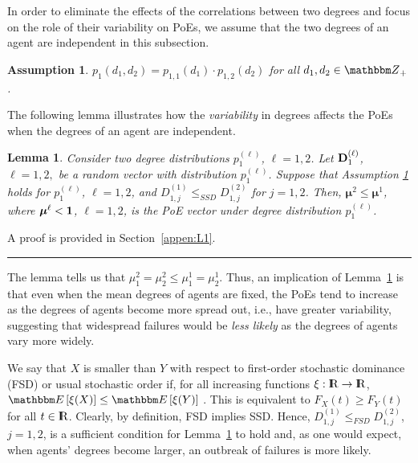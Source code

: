 \documentclass[10pt, journal, compsoc]{IEEEtran}
\newcommand {\bmu} {\boldsymbol{\mu}}
\newcommand {\Z} {{\mathbbm Z}}
\newcommand {\R} {{\rm I\kern-2.5pt R}}
\newtheorem{lemma}{Lemma}
\newtheorem{assm}{Assumption}%
\newcommand{\E}[1]{{\mathbbm E}\left[ #1 \right]}
\newcommand{\myskip}{\\ \vspace{-0.1in}}
\def\QED{~\rule[-1pt]{5pt}{5pt}\par\medskip}
\newenvironment{proof}{{\bf Proof: \ }}{ \hfill \QED}
\begin{document}
In order to eliminate the effects of the 
correlations between two degrees 
and focus on the role of their 
variability on PoEs, we assume that the two
degrees of an agent are independent in this
subsection. 

\begin{assm}	\label{assm:independence}
$p_{1}(d_1, d_2) = p_{1,1}(d_1) \cdot
p_{1,2}(d_2)$ for all $d_1, d_2 \in \Z_+$. 
\myskip
\end{assm}


The following lemma illustrates how the {\em variability} 
in degrees affects the PoEs when the degrees of an 
agent are independent. 


\begin{lemma}	\label{lemma:L1}
Consider two degree distributions $p^{(\ell)}_1$, 
$\ell = 1, 2$.
Let ${\bf D}^{(\ell)}_1$, 
$\ell = 1, 2,$ be a random vector with 
distribution $p^{(\ell)}_1$. 
Suppose that Assumption
\ref{assm:independence} holds for $p_1^{(\ell)}$, 
$\ell = 1, 2$, and $D^{(1)}_{1, j} \leq_{SSD}
D^{(2)}_{1, j}$ for $j = 1, 2$. 
Then, $\bmu^{2} \leq \bmu^{1}$, where 
$\bmu^{\ell} < {\bf 1}$, $\ell = 1, 2$, is the PoE
vector under degree distribution $p^{(\ell)}_1$.
\end{lemma}
\begin{proof}
A proof is provided in Section~\ref{appen:L1}.
\end{proof}

The lemma tells us that $\mu^{2}_1 = 
\mu^{2}_2 \leq \mu^{1}_1 = \mu^{1}_2$. Thus, 
an implication of Lemma~\ref{lemma:L1} is that
even when the mean degrees of agents are fixed, 
the PoEs tend to increase as the degrees of 
agents become more spread out, i.e., have greater 
variability, suggesting that widespread failures
would be {\em less likely} as the degrees of 
agents vary more widely. 

We say that $X$ is smaller than $Y$ with 
respect to first-order stochastic dominance
(FSD) or usual stochastic order if, for all
increasing functions $\xi: \R \to \R$, 
$\E{\xi(X)} \leq \E{\xi(Y)}$ 
\cite{MullerStoyan, SO}. 
This is equivalent to $F_X(t) \geq F_Y(t)$
for all $t \in \R$. 
Clearly, by definition, FSD implies SSD. 
Hence, $D^{(1)}_{1,j} \leq_{FSD}
D^{(2)}_{1,j}$, $j = 1, 2$, is a sufficient
condition for Lemma~\ref{lemma:L1} to hold 
and, as one would expect, when agents' degrees 
become larger, an outbreak of failures is
more likely. 
\end{document}
